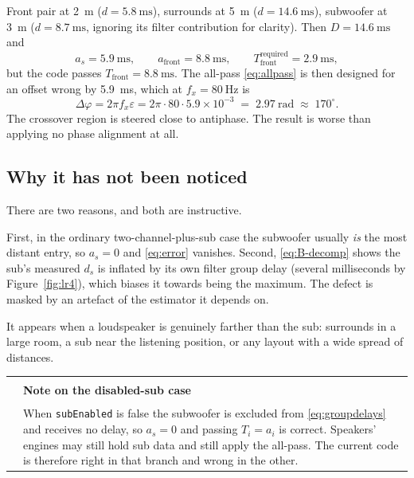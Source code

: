 \documentclass[11pt,a4paper]{article}
\makeatletter
\newcommand{\code}[1]{\texttt{\small #1}}
\newenvironment{remark}[1]
  {\par\medskip\noindent\begin{tabular}{@{}p{0.03\textwidth}p{0.93\textwidth}@{}}
   \textcolor{smtblue}{\rule{2pt}{\baselineskip}} & \textbf{#1}\\[2pt] & \ignorespaces}
  {\end{tabular}\par\medskip}
\makeatother
\begin{document}
Front pair at \SI{2}{\metre} ($d = \SI{5.8}{\milli\second}$), surrounds at
\SI{5}{\metre} ($d = \SI{14.6}{\milli\second}$), subwoofer at \SI{3}{\metre}
($d = \SI{8.7}{\milli\second}$, ignoring its filter contribution for clarity).
Then $D = \SI{14.6}{\milli\second}$ and
%
\begin{equation}
  a_s = \SI{5.9}{\milli\second}, \qquad
  a_{\mathrm{front}} = \SI{8.8}{\milli\second}, \qquad
  T_{\mathrm{front}}^{\text{required}} = \SI{2.9}{\milli\second},
\end{equation}
%
but the code passes $T_{\mathrm{front}} = \SI{8.8}{\milli\second}$. The all-pass
\eqref{eq:allpass} is then designed for an offset wrong by
\SI{5.9}{\milli\second}, which at $f_x = \SI{80}{\hertz}$ is
%
\begin{equation}
  \Delta\varphi = 2\pi f_x \varepsilon = 2\pi \cdot 80 \cdot 5.9\times10^{-3}
  \;=\; \SI{2.97}{\radian} \;\approx\; 170^\circ .
\end{equation}
%
The crossover region is steered close to antiphase. The result is worse than
applying no phase alignment at all.

\subsection{Why it has not been noticed}

There are two reasons, and both are instructive.

First, in the ordinary two-channel-plus-sub case the subwoofer usually \emph{is}
the most distant entry, so $a_s = 0$ and \eqref{eq:error} vanishes. Second,
\eqref{eq:B-decomp} shows the sub's measured $d_s$ is inflated by its own filter
group delay (several milliseconds by Figure~\ref{fig:lr4}), which biases it
towards being the maximum. The defect is masked by an artefact of the estimator
it depends on.

It appears when a loudspeaker is genuinely farther than the sub: surrounds in a
large room, a sub near the listening position, or any layout with a wide spread
of distances.

\begin{remark}{Note on the disabled-sub case}
When \code{subEnabled} is false the subwoofer is excluded from
\eqref{eq:groupdelays} and receives no delay, so $a_s = 0$ and passing $T_i =
a_i$ is correct. Speakers' engines may still hold sub data and still apply the
all-pass. The current code is therefore right in that branch and wrong in the
other.
\end{remark}
\end{document}
